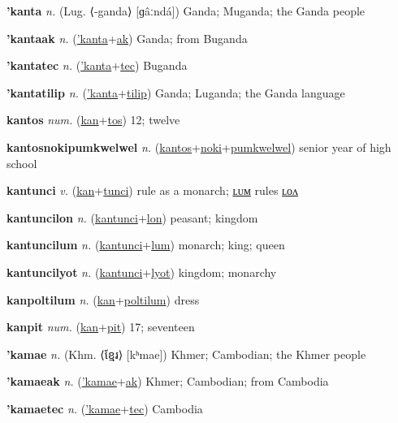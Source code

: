 \textbf{\hypertarget{'kanta}{'kanta}} \textit{n.} (Lug. ⟨-ganda⟩ [ɡâːndá])
Ganda; Muganda; the Ganda people

\textbf{\hypertarget{'kantaak}{'kantaak}} \textit{n.} (\hyperlink{'kanta}{'kanta}+\allowbreak \hyperlink{ak}{ak})
Ganda; from Buganda

\textbf{\hypertarget{'kantatec}{'kantatec}} \textit{n.} (\hyperlink{'kanta}{'kanta}+\allowbreak \hyperlink{tec}{tec})
Buganda

\textbf{\hypertarget{'kantatilip}{'kantatilip}} \textit{n.} (\hyperlink{'kanta}{'kanta}+\allowbreak \hyperlink{tilip}{tilip})
Ganda; Luganda; the Ganda language

\textbf{\hypertarget{kantos}{kantos}} \textit{num.} (\hyperlink{kan}{kan}+\allowbreak \hyperlink{tos}{tos})
12; twelve

\textbf{\hypertarget{kantosnokipumkwelwel}{kantosnokipumkwelwel}} \textit{n.} (\hyperlink{kantos}{kantos}+\allowbreak \hyperlink{noki}{noki}+\allowbreak \hyperlink{pumkwelwel}{pumkwelwel})
senior year of high school

\textbf{\hypertarget{kantunci}{kantunci}} \textit{v.} (\hyperlink{kan}{kan}+\allowbreak \hyperlink{tunci}{tunci})
rule as a monarch; \hyperlink{kantuncilum}{ʟᴜᴍ} rules \hyperlink{kantuncilon}{ʟᴏᴧ}

\textbf{\hypertarget{kantuncilon}{kantuncilon}} \textit{n.} (\hyperlink{kantunci}{kantunci}+\allowbreak \hyperlink{lon}{lon})
peasant; kingdom

\textbf{\hypertarget{kantuncilum}{kantuncilum}} \textit{n.} (\hyperlink{kantunci}{kantunci}+\allowbreak \hyperlink{lum}{lum})
monarch; king; queen

\textbf{\hypertarget{kantuncilyot}{kantuncilyot}} \textit{n.} (\hyperlink{kantunci}{kantunci}+\allowbreak \hyperlink{lyot}{lyot})
kingdom; monarchy

\textbf{\hypertarget{kanpoltilum}{kanpoltilum}} \textit{n.} (\hyperlink{kan}{kan}+\allowbreak \hyperlink{poltilum}{poltilum})
dress

\textbf{\hypertarget{kanpit}{kanpit}} \textit{num.} (\hyperlink{kan}{kan}+\allowbreak \hyperlink{pit}{pit})
17; seventeen

\textbf{\hypertarget{'kamae}{'kamae}} \textit{n.} (Khm. ⟨{\khmer{}ខ្មែរ}⟩ [kʰmae])
Khmer; Cambodian; the Khmer people

\textbf{\hypertarget{'kamaeak}{'kamaeak}} \textit{n.} (\hyperlink{'kamae}{'kamae}+\allowbreak \hyperlink{ak}{ak})
Khmer; Cambodian; from Cambodia

\textbf{\hypertarget{'kamaetec}{'kamaetec}} \textit{n.} (\hyperlink{'kamae}{'kamae}+\allowbreak \hyperlink{tec}{tec})
Cambodia

